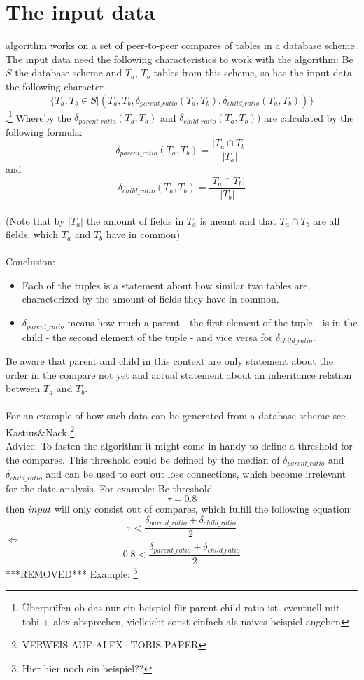 \documentclass[10pt, journal, twocolumn]{IEEEtran}
\begin{document}
\section{The input data}
 algorithm works on a set of peer-to-peer compares of tables in a database scheme. The input data need the following characteristics to work with the algorithm: Be $S$ the database scheme and $T_a$, $T_b$ tables from this scheme, so has the input data the following character 
$$\{T_a, T_b \in S | (T_a, T_b, \delta_{parent\_ratio}(T_a, T_b),\delta_{child\_ratio}(T_a, T_b))\}$$\hspace{-300cm} 
.\footnote{Überprüfen ob das nur ein beispiel für parent child ratio ist. eventuell mit tobi + alex absprechen, vielleicht sonst einfach als naives beispiel angeben} Whereby the $\delta_{parent\_ratio}(T_a, T_b)$ and $\delta_{child\_ratio}(T_a, T_b))$ are calculated by the following formula: $$\delta_{parent\_ratio}(T_a, T_b) = \frac{ | T_a \cap T_b |}{ | T_a |} $$ and  $$\delta_{child\_ratio}(T_a, T_b) = \frac{ | T_a \cap T_b |}{ | T_b |} $$\\
(Note that by $| T_a |$ the amount of fields in $T_a$ is meant and that $T_a \cap T_b$ are all fields, which $T_a$ and $T_b$ have in common)\\
\\Conclusion:
\begin{itemize}
\item Each of the tuples is a statement about how similar two tables are, characterized by the amount of fields they have in common. 
\item $\delta_{parent\_ratio}$ means how much a parent - the first element of the tuple - is in the child - the second element of the tuple - and vice versa for $\delta_{child\_ratio}$.
\end{itemize}
Be aware that parent and child in this context are only statement about the order in the compare not yet and actual statement about an inheritance relation between $T_a$ and $T_b$.\\
\\For an example of how such data can be generated from a database scheme see Kastius\&Nack \footnote{VERWEIS AUF ALEX+TOBIS PAPER}.\\
Advice: To fasten the algorithm it might come in handy to define a threshold for the compares. This threshold could be defined by the median of $\delta_{parent\_ratio}$ and $\delta_{child\_ratio}$ and can be used to sort out lose connections, which become irrelevant for the data analysis. For example: Be threshold $$ \tau = 0.8$$ then $input$ will only consist out of compares, which fulfill the following equation: $$ \tau < \frac{\delta_{parent\_ratio} +  \delta_{child\_ratio}}{2} $$ $\Leftrightarrow$ $$0.8 < \frac{\delta_{parent\_ratio} +  \delta_{child\_ratio}}{2} $$
***REMOVED***
Example: \footnote{Hier hier noch ein beispiel??}
\end{document}
